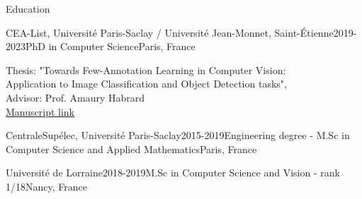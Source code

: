 \documentclass{resume} %
\begin{document}
\vspace{-15pt}

\begin{rSection}{Education}

\begin{rSubsection}{CEA-List, Université Paris-Saclay / Université Jean-Monnet, Saint-Étienne}{2019-2023}{PhD in Computer Science}{Paris, France}
    \item[] Thesis: "Towards Few-Annotation Learning in Computer Vision:\\ Application to Image Classification and Object Detection tasks",\\ Advisor: Prof. Amaury Habrard \\ \href{https://arxiv.org/abs/2311.04888}{Manuscript link}
    
\end{rSubsection}


\begin{rSubsection}{CentraleSupélec, Université Paris-Saclay}{2015-2019}{Engineering degree - M.Sc in Computer Science and Applied Mathematics}{Paris, France}
    \item[] 
    \vspace{-15pt}
\end{rSubsection}


\begin{rSubsection}{Université de Lorraine}{2018-2019}{M.Sc in Computer Science and Vision - rank 1/18}{Nancy, France}
    \item[] 
    \vspace{-15pt}
\end{rSubsection}


\end{rSection}
\end{document}

